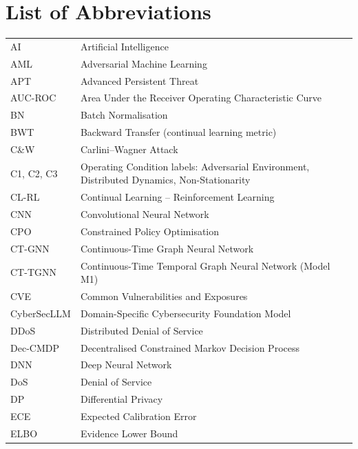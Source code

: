 
\chapter*{List of Abbreviations}

\begin{longtable}{@{}p{3.8cm} p{10cm}@{}}
AI & Artificial Intelligence \\
AML & Adversarial Machine Learning \\
APT & Advanced Persistent Threat \\
AUC-ROC & Area Under the Receiver Operating Characteristic Curve \\
BN & Batch Normalisation \\
BWT & Backward Transfer (continual learning metric) \\
C\&W & Carlini--Wagner Attack \\
C1, C2, C3 & Operating Condition labels: Adversarial Environment, Distributed Dynamics, Non-Stationarity \\
CL-RL & Continual Learning -- Reinforcement Learning \\
CNN & Convolutional Neural Network \\
CPO & Constrained Policy Optimisation \\
CT-GNN & Continuous-Time Graph Neural Network \\
CT-TGNN & Continuous-Time Temporal Graph Neural Network (Model M1) \\
CVE & Common Vulnerabilities and Exposures \\
CyberSecLLM & Domain-Specific Cybersecurity Foundation Model \\
DDoS & Distributed Denial of Service \\
Dec-CMDP & Decentralised Constrained Markov Decision Process \\
DNN & Deep Neural Network \\
DoS & Denial of Service \\
DP & Differential Privacy \\
ECE & Expected Calibration Error \\
ELBO & Evidence Lower Bound \\

\end{longtable}
